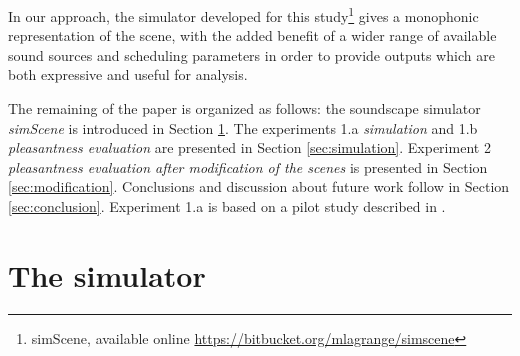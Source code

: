 \documentclass[twoside,twocolumn]{article}
\begin{document}
In our approach, the simulator developed for this study\footnote{simScene, available online \url{https://bitbucket.org/mlagrange/simscene}} gives a monophonic representation of the scene, with the added benefit of a wider range of available sound sources and scheduling parameters in order to provide outputs which are both expressive and useful for analysis.


The remaining of the paper is organized as follows: the soundscape simulator \emph{simScene} is introduced in Section \ref{sec:simulator}. The experiments  1.a \emph{simulation} and  1.b \emph{pleasantness evaluation} are presented in Section \ref{sec:simulation}. Experiment 2 \emph{pleasantness evaluation after modification of the scenes} is presented in Section \ref{sec:modification}. Conclusions and discussion about future work follow in Section \ref{sec:conclusion}. Experiment 1.a is based on a pilot study described in \cite{lafay2014new}.






\section{The simulator}
\label{sec:simulator}

\end{document}
